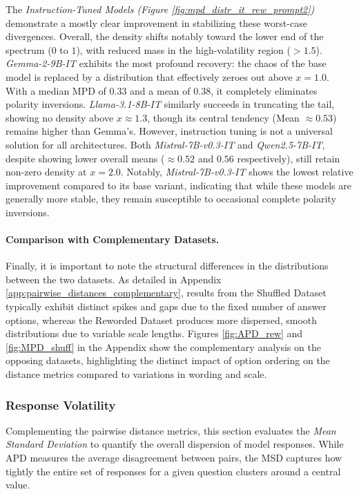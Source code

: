 The \textit{Instruction-Tuned Models (Figure \ref{fig:mpd_distr_it_rew_prompt2})} demonstrate a mostly clear improvement in stabilizing these worst-case divergences.
Overall, the density shifts notably toward the lower end of the spectrum ($0$ to $1$), with reduced mass in the high-volatility region ($>1.5$).
\textit{Gemma-2-9B-IT} exhibits the most profound recovery: the chaos of the base model is replaced by a distribution that effectively zeroes out above $x=1.0$. With a median MPD of $0.33$ and a mean of $0.38$, it completely eliminates polarity inversions.
\textit{Llama-3.1-8B-IT} similarly succeeds in truncating the tail, showing no density above $x \approx 1.3$, though its central tendency (Mean $\approx 0.53$) remains higher than Gemma's.
However, instruction tuning is not a universal solution for all architectures. Both \textit{Mistral-7B-v0.3-IT} and \textit{Qwen2.5-7B-IT}, despite showing lower overall means ($\approx 0.52$ and $0.56$ respectively), still retain non-zero density at $x=2.0$. Notably, \textit{Mistral-7B-v0.3-IT} shows the lowest relative improvement compared to its base variant, indicating that while these models are generally more stable, they remain susceptible to occasional complete polarity inversions.

\vspace{-0.4cm}
\paragraph{Comparison with Complementary Datasets.}
Finally, it is important to note the structural differences in the distributions between the two datasets. As detailed in Appendix \ref{app:pairwise_distances_complementary}, results from the Shuffled Dataset typically exhibit distinct spikes and gaps due to the fixed number of answer options, whereas the Reworded Dataset produces more dispersed, smooth distributions due to variable scale lengths. Figures \ref{fig:APD_rew} and \ref{fig:MPD_shuff} in the Appendix show the complementary analysis on the opposing datasets, highlighting the distinct impact of option ordering on the distance metrics compared to variations in wording and scale.


\subsubsection{Response Volatility}
\label{results:msd_analysis}
Complementing the pairwise distance metrics, this section evaluates the \textit{Mean Standard Deviation} to quantify the overall dispersion of model responses. While APD measures the average disagreement between pairs, the MSD captures how tightly the entire set of responses for a given question clusters around a central value.

